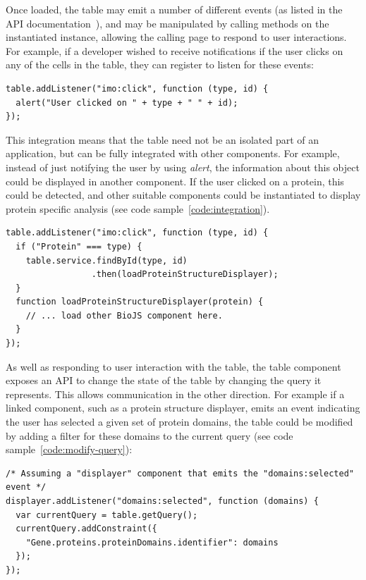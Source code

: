 \documentclass[10pt,a4paper,twocolumn]{article}
\begin{document}
Once loaded, the table may emit a number of different events (as listed in the
API documentation~\cite{site:biojs-doc}), and may be manipulated by calling 
methods on the instantiated instance, allowing the calling page to respond to 
user interactions. For example, if a developer wished to receive notifications 
if the user clicks on any of the cells in the table, they can register to 
listen for these events:

\begin{lstlisting}[caption={Adding an Event Listener}, label={code:add-listener}]
table.addListener("imo:click", function (type, id) {
  alert("User clicked on " + type + " " + id);
});
\end{lstlisting}

This integration means that the table need not be an isolated part of an
application, but can be fully integrated with other components. For example,
instead of just notifying the user by using \emph{alert}, the information about
this object could be displayed in another component. If the user clicked on a
protein, this could be detected, and other suitable components could be
instantiated to display protein specific analysis (see code
sample~\ref{code:integration}).

\begin{lstlisting}[caption={Integrating with Other Components - Example 1}, label={code:integration}]
table.addListener("imo:click", function (type, id) {
  if ("Protein" === type) {
    table.service.findById(type, id)
                 .then(loadProteinStructureDisplayer);
  }
  function loadProteinStructureDisplayer(protein) {
    // ... load other BioJS component here.
  }
});
\end{lstlisting}

As well as responding to user interaction with the table, the table component
exposes an API to change the state of the table by changing the query it
represents. This allows communication in the other direction. For example if a
linked component, such as a protein structure displayer, emits an event
indicating the user has selected a given set of protein domains, the table could
be modified by adding a filter for these domains to the current query (see code
sample~\ref{code:modify-query}):

\begin{lstlisting}[caption={Integrating with Other Components - Example 2}, label={code:modify-query}]
/* Assuming a "displayer" component that emits the "domains:selected" event */
displayer.addListener("domains:selected", function (domains) {
  var currentQuery = table.getQuery();
  currentQuery.addConstraint({
    "Gene.proteins.proteinDomains.identifier": domains
  });
});
\end{lstlisting}
\end{document}

